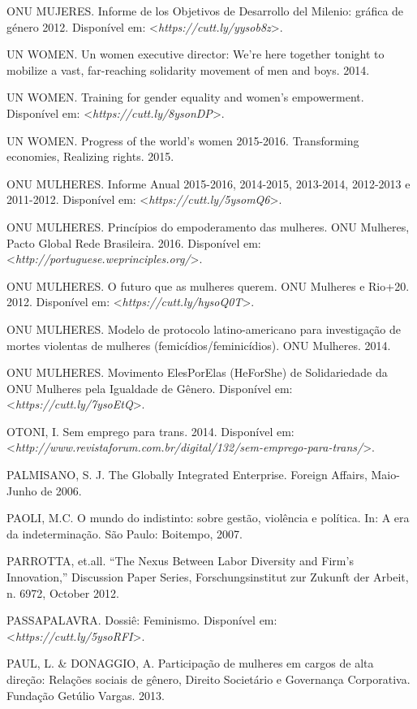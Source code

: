 \begin{Parskip}
ONU MUJERES. Informe de los Objetivos de Desarrollo del Milenio: gráfica
de género 2012.
Disponível em: \textless{}\emph{https://cutt.ly/yysob8z}\textgreater{}.

UN WOMEN. Un women executive director: We're here together tonight to
mobilize a vast, far-reaching solidarity movement of men and boys. 2014.

UN WOMEN. Training for gender equality and women's empowerment.
Disponível em: \textless{}\emph{https://cutt.ly/8ysonDP}\textgreater{}.

UN WOMEN. Progress of the world's women 2015-2016. Transforming
economies, Realizing rights. 2015.

ONU MULHERES. Informe Anual 2015-2016, 2014-2015, 2013-2014, 2012-2013 e
2011-2012. Disponível em: \textless{}\emph{https://cutt.ly/5ysomQ6}\textgreater{}.

ONU MULHERES. Princípios do empoderamento das mulheres. ONU Mulheres,
Pacto Global Rede Brasileira. 2016.
Disponível em: \textless{}\emph{http://portuguese.weprinciples.org/}\textgreater{}.

ONU MULHERES. O futuro que as mulheres querem. ONU Mulheres e Rio+20.
2012.
Disponível em: \textless{}\emph{https://cutt.ly/hysoQ0T}\textgreater{}.

ONU MULHERES. Modelo de protocolo latino-americano para investigação de
mortes violentas de mulheres (femicídios/feminicídios). ONU Mulheres.
2014.

ONU MULHERES. Movimento ElesPorElas (HeForShe) de Solidariedade da ONU
Mulheres pela Igualdade de Gênero.
Disponível em: \textless{}\emph{https://cutt.ly/7ysoEtQ}\textgreater{}.

OTONI, I. Sem emprego para trans. 2014.
Disponível em: \textless{}\emph{http://www.revistaforum.com.br/digital/132/sem-emprego-para-trans/}\textgreater{}.

PALMISANO, S. J. The Globally Integrated Enterprise. Foreign Affairs,
Maio-Junho de 2006.

PAOLI, M.C. O mundo do indistinto: sobre gestão, violência e política.
In: A era da indeterminação. São Paulo: Boitempo, 2007.

PARROTTA, et.all. ``The Nexus Between Labor Diversity and Firm's
Innovation,'' Discussion Paper Series, Forschungsinstitut zur Zukunft
der Arbeit, n. 6972, October 2012.

PASSAPALAVRA. Dossiê: Feminismo.
Disponível em: \textless{}\emph{https://cutt.ly/5ysoRFI}\textgreater{}.

PAUL, L. \& DONAGGIO, A. Participação de mulheres em cargos de alta
direção: Relações sociais de gênero, Direito Societário e Governança
Corporativa. Fundação Getúlio Vargas. 2013.


\end{Parskip}
